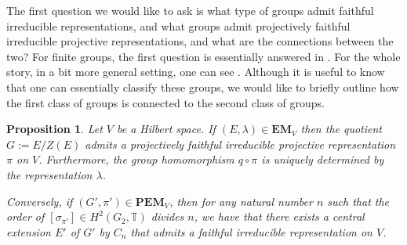 \documentclass[11pt, oneside, reqno]{amsart}
\newcommand{\bbT}{\mathbb{T}}
\newcommand{\EM}{\mathbf{EM}}
\newcommand{\PEM}{\mathbf{PEM}}
\theoremstyle{definition}
\theoremstyle{plain}
\newtheorem{proposition}[definition]{Proposition}
\theoremstyle{remark}
\begin{document}
The first question we would like to ask is what type of groups admit faithful irreducible representations, and what groups admit projectively faithful irreducible projective representations, and what are the connections between the two? For finite groups, the first question is essentially answered in \cite{Gaschtz54}. For the whole story, in a bit more general setting, one can see \cite{BekkadelaHarpe08,BekkadelaHarpe13}. Although it is useful to know that one can essentially classify these groups, we would like to briefly outline how the first class of groups is connected to the second class of groups.

\begin{proposition}\label{prop:correspondence between EM and PEM}
    Let $V$ be a Hilbert space. If $(E,\lambda) \in \EM_V$ then the quotient $G := E/Z(E)$ admits a projectively faithful irreducible projective representation $\pi$ on $V$. Furthermore, the group homomorphism $q \circ \pi$ is uniquely determined by the representation $\lambda$.

    Conversely, if $(G',\pi') \in \PEM_V$, then for any natural number $n$ such that the order of $[\sigma_{\pi'}] \in H^2(G_2,\bbT)$ divides $n$, we have that there exists a central extension $E'$ of $G'$ by $C_n$ that admits a faithful irreducible representation on $V$.
\end{proposition}
\end{document}
